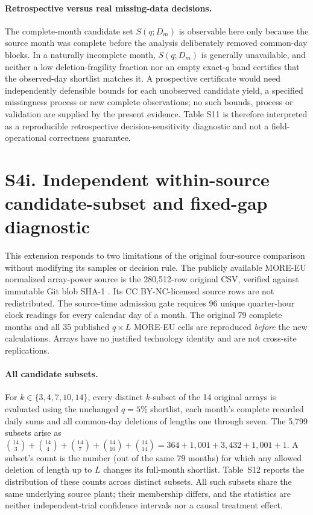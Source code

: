 \documentclass[11pt]{article}
\begin{document}
\paragraph{Retrospective versus real missing-data decisions.}
The complete-month candidate set $S(q;D_m)$ is observable here only because the source month was complete before the analysis deliberately removed common-day blocks. In a naturally incomplete month, $S(q;D_m)$ is generally unavailable, and neither a low deletion-fragility fraction nor an empty exact-$q$ band certifies that the observed-day shortlist matches it. A prospective certificate would need independently defensible bounds for each unobserved candidate yield, a specified missingness process or new complete observations; no such bounds, process or validation are supplied by the present evidence. Table S11 is therefore interpreted as a reproducible retrospective decision-sensitivity diagnostic and not a field-operational correctness guarantee.


\section*{S4i. Independent within-source candidate-subset and fixed-gap diagnostic}
This extension responds to two limitations of the original four-source comparison without modifying its samples or decision rule. The publicly available MORE-EU normalized array-power source is the 280,512-row original CSV, verified against immutable Git blob SHA-1 \texttt{}. Its CC BY-NC-licensed source rows are not redistributed. The source-time admission gate requires 96 unique quarter-hour clock readings for every calendar day of a month. The original 79 complete months and all 35 published $q\times L$ MORE-EU cells are reproduced \emph{before} the new calculations. Arrays have no justified technology identity and are not cross-site replications.

\paragraph{All candidate subsets.} For $k\in\{3,4,7,10,14\}$, every distinct $k$-subset of the 14 original arrays is evaluated using the unchanged $q=5\%$ shortlist, each month's complete recorded daily sums and all common-day deletions of lengths one through seven. The 5,799 subsets arise as $\binom{14}{3}+\binom{14}{4}+\binom{14}{7}+\binom{14}{10}+\binom{14}{14}=364+1{,}001+3{,}432+1{,}001+1$. A subset's count is the number (out of the same 79 months) for which any allowed deletion of length up to $L$ changes its full-month shortlist. Table~S12 reports the distribution of these counts across distinct subsets. All such subsets share the same underlying source plant; their membership differs, and the statistics are neither independent-trial confidence intervals nor a causal treatment effect.
\end{document}
